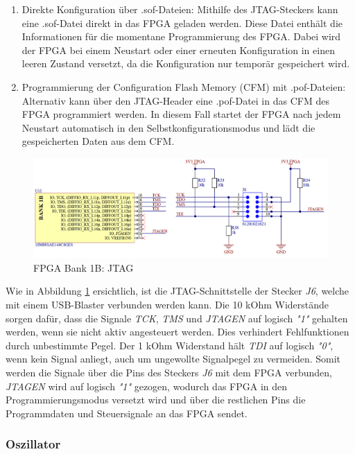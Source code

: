 \begin{enumerate}
    \item Direkte Konfiguration über .sof-Dateien:
    Mithilfe des JTAG-Steckers kann eine .sof-Datei direkt in das FPGA geladen werden. Diese Datei enthält die Informationen für die momentane Programmierung des FPGA. Dabei wird der FPGA bei einem Neustart oder einer erneuten Konfiguration in einen leeren Zustand versetzt, da die Konfiguration nur temporär gespeichert wird.
    \item Programmierung der Configuration Flash Memory (CFM) mit .pof-Dateien: 
    Alternativ kann über den JTAG-Header eine .pof-Datei in das CFM des FPGA programmiert werden. In diesem Fall startet der FPGA nach jedem Neustart automatisch in den Selbstkonfigurationsmodus und lädt die gespeicherten Daten aus dem CFM.
\end{enumerate}

\begin{figure}[H]
    \centering
    \includegraphics[width=1.0\linewidth]{Figures/Chap3/Schematics/Bank1B_JTAG.png}
    \caption{FPGA Bank 1B: JTAG}
    \label{FPGA JTAG}
\end{figure}

Wie in Abbildung \ref{FPGA JTAG} ersichtlich, ist die JTAG-Schnittstelle der Stecker \textit{J6}, welche mit einem USB-Blaster verbunden werden kann. Die 10 kOhm Widerstände sorgen dafür, dass die Signale \textit{TCK}, \textit{TMS} und \textit{JTAGEN} auf logisch \textit{"1"} gehalten werden, wenn sie nicht aktiv angesteuert werden. Dies verhindert Fehlfunktionen durch unbestimmte Pegel. Der 1 kOhm Widerstand hält \textit{TDI} auf logisch \textit{"0"}, wenn kein Signal anliegt, auch um ungewollte Signalpegel zu vermeiden. Somit werden die Signale über die Pins des Steckers \textit{J6} mit dem FPGA verbunden, \textit{JTAGEN} wird auf logisch \textit{"1"} gezogen, wodurch das FPGA in den Programmierungsmodus versetzt wird und über die restlichen Pins die Programmdaten und Steuersignale an das FPGA sendet.


\subsubsection{Oszillator}

